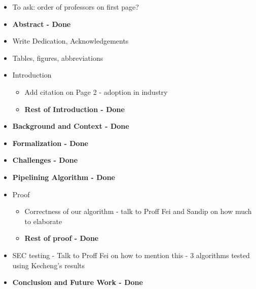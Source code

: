 \begin{itemize} 
  \item {To ask: order of professors on first page?} 
  \item {\textbf {Abstract - Done}} 
  \item Write Dedication, Acknowledgements
  \item Tables, figures, abbreviations
  \item Introduction
  		\begin{itemize}
  		\item Add citation on Page 2 - adoption in industry
  		\item {\textbf {Rest of Introduction - Done}}
  		\end{itemize}
  \item {\textbf {Background and Context - Done}}
  \item {\textbf {Formalization - Done}}
  \item {\textbf {Challenges - Done}}
  \item {\textbf {Pipelining Algorithm - Done}}
  \item Proof
  		  \begin{itemize}
  		  \item Correctness of our algorithm - talk to Proff Fei and Sandip on how much to elaborate
  		  \item {\textbf {Rest of proof - Done}}
  		  \end{itemize}	
  \item SEC testing - Talk to Proff Fei on how to mention this - 3 algorithms tested using Kecheng's results
  \item {\textbf {Conclusion and Future Work - Done}}
\end{itemize}